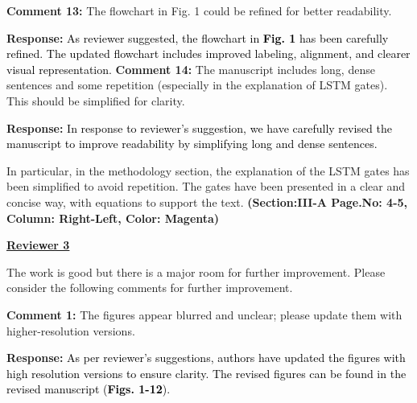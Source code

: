 \documentclass[12pt]{article}
\begin{document}
{\noindent\textbf{Comment 13:} The flowchart in Fig. 1 could be refined for better readability.


\hspace{-1.5em}\textbf{Response:}
\noindent\textcolor{black}{As reviewer suggested, the flowchart in \textbf{Fig. 1} has been carefully refined.  The updated flowchart includes improved labeling, alignment, and clearer visual representation.}\newline
\newline
\noindent\textbf{Comment 14:} The manuscript includes long, dense sentences and some repetition (especially in the explanation of LSTM gates). This should be simplified for clarity.
\vspace{0.15cm}

\hspace{-1.5em}\textbf{Response:} \noindent\textcolor{black}{In response to reviewer's suggestion, we have carefully revised the manuscript to improve readability by simplifying long and dense sentences.}

In particular, in the methodology section, the explanation of the LSTM gates has been simplified to avoid repetition. The gates have been presented in a clear and concise way, with equations to support the text. \textbf{(Section:III-A  Page.No: 4-5, Column: Right-Left, Color: Magenta)}\newline
\newline





\begin{center}
	\fontsize{14}{1}\textbf{\underline{Reviewer 3}}\\
\end{center}



\hspace{-2em} The work is good but there is a major room for further improvement. Please consider the following comments for further improvement.


\noindent\textbf{Comment 1:} The figures appear blurred and unclear; please update them with higher-resolution versions.
\vspace{0.15cm}

\hspace{-1.5em}\textbf{Response:} \noindent\textcolor{black}{As per reviewer's suggestions, authors have updated the figures with high resolution versions to ensure clarity. The revised figures can be found in the revised manuscript (\textbf{Figs. 1-12}). }\newline
\newline


}
\end{document}
